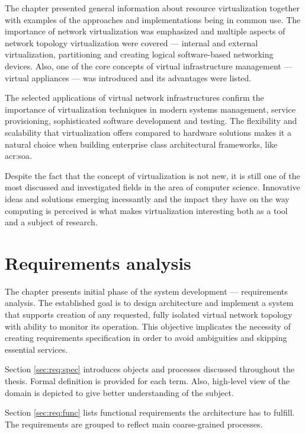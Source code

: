 \documentclass[11pt,openany]{book}
\begin{document}
      The chapter presented general information about resource virtualization together with examples of the approaches
      and implementations being in common use. The importance of network virtualization was emphasized and multiple
      aspects of network topology virtualization were covered --- internal and external virtualization, partitioning and
      creating logical software-based networking devices. Also, one of the core concepts of virtual infrastructure
      management --- virtual appliances --- was introduced and its advantages were listed.

      The selected applications of virtual network infrastructures confirm the importance of virtualization techniques
      in modern systems management, service provisioning, sophisticated software development and testing. The
      flexibility and scalability that virtualization offers compared to hardware solutions makes it a natural choice
      when building enterprise class architectural frameworks, like \gls{acr:soa}.

      Despite the fact that the concept of virtualization is not new, it is still one of the most discussed and
      investigated fields in the area of computer science. Innovative ideas and solutions emerging incessantly and the
      impact they have on the way computing is perceived is what makes virtualization interesting both as a tool and a
      subject of research.


  \chapter{Requirements analysis}
  \label{chap:req}

    The chapter presents initial phase of the system development --- requirements analysis. The established goal is to
    design architecture and implement a system that supports creation of any requested, fully isolated virtual network
    topology with ability to monitor its operation. This objective implicates the necessity of creating requirements
    specification in order to avoid ambiguities and skipping essential services.

    Section \ref{sec:req:spec} introduces objects and processes discussed throughout the thesis. Formal definition is
    provided for each term. Also, high-level view of the domain is depicted to give better understanding of the subject.

    Section \ref{sec:req:func} lists functional requirements the architecture has to fulfill. The requirements are
    grouped to reflect main coarse-grained processes.
    
\end{document}
